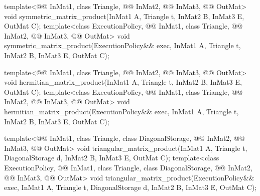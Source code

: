 %
\begin{itemdecl}
template<@@ InMat1, class Triangle, @@ InMat2, @@ InMat3,
         @@ OutMat>
  void symmetric_matrix_product(InMat1 A, Triangle t, InMat2 B, InMat3 E, OutMat C);
template<class ExecutionPolicy,
         @@ InMat1, class Triangle, @@ InMat2, @@ InMat3,
         @@ OutMat>
  void symmetric_matrix_product(ExecutionPolicy&& exec,
                                InMat1 A, Triangle t, InMat2 B, InMat3 E, OutMat C);

template<@@ InMat1, class Triangle, @@ InMat2, @@ InMat3,
         @@ OutMat>
  void hermitian_matrix_product(InMat1 A, Triangle t, InMat2 B, InMat3 E, OutMat C);
template<class ExecutionPolicy,
         @@ InMat1, class Triangle, @@ InMat2, @@ InMat3,
         @@ OutMat>
  void hermitian_matrix_product(ExecutionPolicy&& exec,
                                InMat1 A, Triangle t, InMat2 B, InMat3 E, OutMat C);

template<@@ InMat1, class Triangle, class DiagonalStorage,
         @@ InMat2, @@ InMat3, @@ OutMat>
  void triangular_matrix_product(InMat1 A, Triangle t, DiagonalStorage d, InMat2 B, InMat3 E,
                                 OutMat C);
template<class ExecutionPolicy,
         @@ InMat1, class Triangle, class DiagonalStorage,
         @@ InMat2, @@ InMat3, @@ OutMat>
  void triangular_matrix_product(ExecutionPolicy&& exec,
                                 InMat1 A, Triangle t, DiagonalStorage d, InMat2 B, InMat3 E,
                                 OutMat C);
\end{itemdecl}

